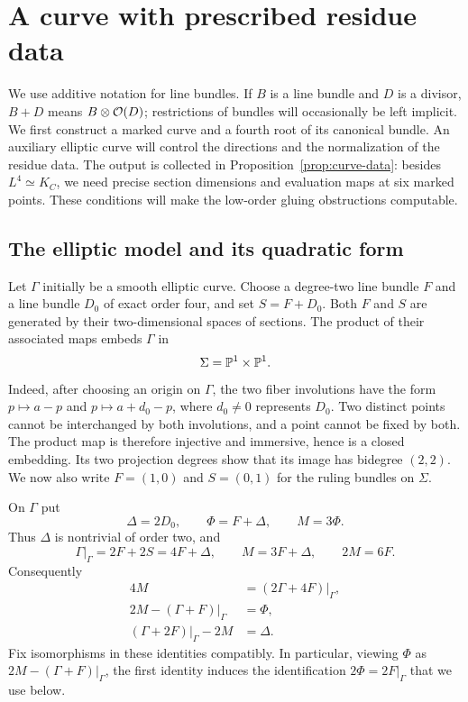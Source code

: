 \section{A curve with prescribed residue data}
\label{curve:section}

We use additive notation for line bundles.  If $B$ is a line bundle and
$D$ is a divisor, $B+D$ means $B\otimes\mathcal O(D)$; restrictions of bundles
will occasionally be left implicit.  We first construct a marked curve
and a fourth root of its canonical bundle.  An auxiliary elliptic curve
will control the directions and the normalization of the residue data.
The output is collected in Proposition~\ref{prop:curve-data}: besides
$L^4\simeq K_C$, we need precise section dimensions and evaluation maps
at six marked points. These conditions will make the low-order gluing
obstructions computable.

\subsection{The elliptic model and its quadratic form}

Let $\Gamma$ initially be a smooth elliptic curve.  Choose a degree-two
line bundle $F$ and a line bundle $D_0$ of exact order four, and set
$S=F+D_0$.  Both $F$ and $S$ are generated by their two-dimensional
spaces of sections.  The product of their associated maps embeds
$\Gamma$ in
\[
  \Sigma=\mathbb P^1\times\mathbb P^1.
\]
Indeed, after choosing an origin on $\Gamma$, the two fiber involutions
have the form $p\mapsto a-p$ and $p\mapsto a+d_0-p$, where $d_0\ne0$
represents $D_0$.  Two distinct points cannot be interchanged by both
involutions, and a point cannot be fixed by both.  The product map is
therefore injective and immersive, hence is a closed embedding.  Its
two projection degrees show that its image has bidegree $(2,2)$.
We now also write $F=(1,0)$ and $S=(0,1)$ for the ruling bundles on
$\Sigma$.

On $\Gamma$ put
\[
  \Delta=2D_0,\qquad \Phi=F+\Delta,\qquad M=3\Phi.
\]
Thus $\Delta$ is nontrivial of order two, and
\[
  \Gamma|_\Gamma=2F+2S=4F+\Delta,
  \qquad M=3F+\Delta,\qquad 2M=6F.
\]
Consequently
\begin{equation}\label{curve:bundle-identities}
\begin{split}
  4M&=(2\Gamma+4F)|_\Gamma,\\
  2M-(\Gamma+F)|_\Gamma&=\Phi,\\
  (\Gamma+2F)|_\Gamma-2M&=\Delta.
\end{split}
\end{equation}
Fix isomorphisms in these identities compatibly.  In particular,
viewing $\Phi$ as $2M-(\Gamma+F)|_\Gamma$, the first identity induces
the identification $2\Phi=2F|_\Gamma$ that we use below.

